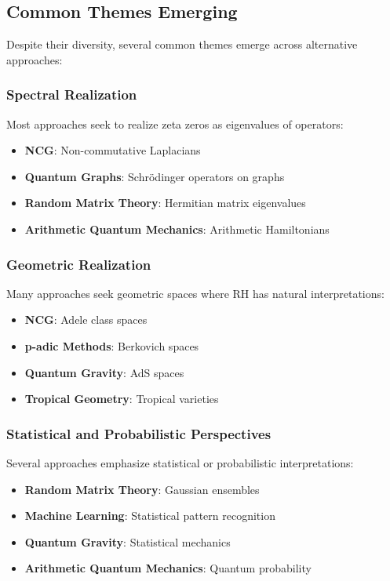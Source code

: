 \subsection{Common Themes Emerging}

Despite their diversity, several common themes emerge across alternative approaches:

\subsubsection{Spectral Realization}

Most approaches seek to realize zeta zeros as eigenvalues of operators:

\begin{itemize}
\item \textbf{NCG}: Non-commutative Laplacians
\item \textbf{Quantum Graphs}: Schrödinger operators on graphs  
\item \textbf{Random Matrix Theory}: Hermitian matrix eigenvalues
\item \textbf{Arithmetic Quantum Mechanics}: Arithmetic Hamiltonians
\end{itemize}

\subsubsection{Geometric Realization}

Many approaches seek geometric spaces where RH has natural interpretations:

\begin{itemize}
\item \textbf{NCG}: Adele class spaces
\item \textbf{p-adic Methods}: Berkovich spaces
\item \textbf{Quantum Gravity}: AdS spaces
\item \textbf{Tropical Geometry}: Tropical varieties
\end{itemize}

\subsubsection{Statistical and Probabilistic Perspectives}

Several approaches emphasize statistical or probabilistic interpretations:

\begin{itemize}
\item \textbf{Random Matrix Theory}: Gaussian ensembles
\item \textbf{Machine Learning}: Statistical pattern recognition
\item \textbf{Quantum Gravity}: Statistical mechanics
\item \textbf{Arithmetic Quantum Mechanics}: Quantum probability
\end{itemize}

